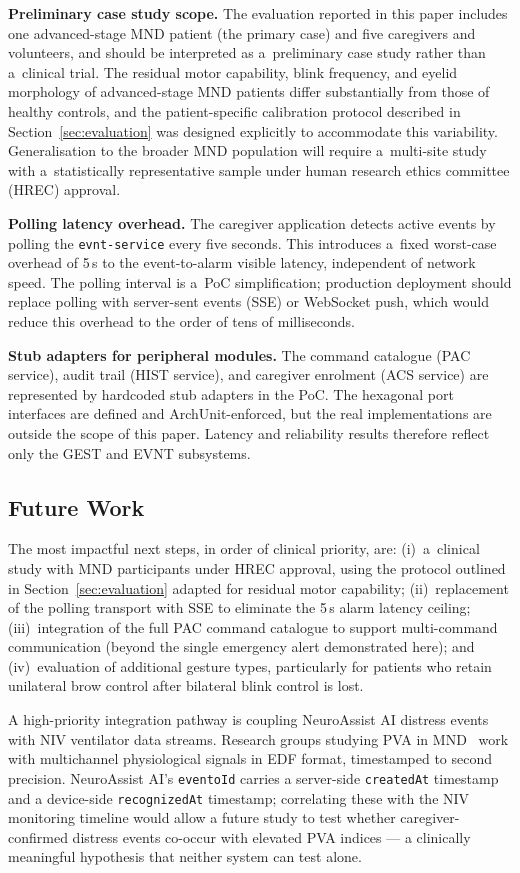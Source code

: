 \textbf{Preliminary case study scope.} The evaluation reported in this paper
includes one advanced-stage MND patient (the primary case) and five caregivers and
volunteers, and should be interpreted as a~preliminary case study rather than a~clinical
trial. The residual motor capability, blink frequency, and eyelid morphology of
advanced-stage MND patients differ substantially from those of healthy controls, and the
patient-specific calibration protocol described in Section~\ref{sec:evaluation} was
designed explicitly to accommodate this variability. Generalisation to the broader MND
population will require a~multi-site study with a~statistically representative sample
under human research ethics committee (HREC) approval.

\textbf{Polling latency overhead.} The caregiver application detects active events
by polling the \texttt{evnt-service} every five seconds. This introduces a~fixed
worst-case overhead of 5\,s to the event-to-alarm visible latency, independent of
network speed. The polling interval is a~PoC simplification; production deployment
should replace polling with server-sent events (SSE) or WebSocket push, which would
reduce this overhead to the order of tens of milliseconds.

\textbf{Stub adapters for peripheral modules.} The command catalogue (PAC service),
audit trail (HIST service), and caregiver enrolment (ACS service) are represented by
hardcoded stub adapters in the PoC. The hexagonal port interfaces are defined and
ArchUnit-enforced, but the real implementations are outside the scope of this paper.
Latency and reliability results therefore reflect only the GEST and EVNT subsystems.

\subsection{Future Work}

The most impactful next steps, in order of clinical priority, are: (i)~a~clinical
study with MND participants under HREC approval, using the protocol outlined in
Section~\ref{sec:evaluation} adapted for residual motor capability; (ii)~replacement
of the polling transport with SSE to eliminate the 5\,s alarm latency ceiling;
(iii)~integration of the full PAC command catalogue to support multi-command
communication (beyond the single emergency alert demonstrated here); and
(iv)~evaluation of additional gesture types, particularly for patients who retain
unilateral brow control after bilateral blink control is lost.

A high-priority integration pathway is coupling NeuroAssist AI distress events with NIV ventilator data streams. Research groups studying PVA in MND~\cite{stell2024pva, yang2026pva} work with multichannel physiological signals in EDF format, timestamped to second precision. NeuroAssist AI's \texttt{eventoId} carries a server-side \texttt{createdAt} timestamp and a device-side \texttt{recognizedAt} timestamp; correlating these with the NIV monitoring timeline would allow a future study to test whether caregiver-confirmed distress events co-occur with elevated PVA indices — a clinically meaningful hypothesis that neither system can test alone.